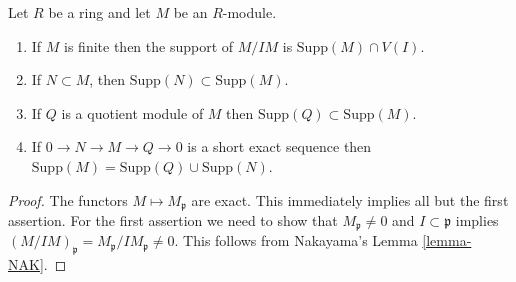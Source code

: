 \begin{lemma}
\label{lemma-support-quotient}
Let $R$ be a ring and let $M$ be an $R$-module.
\begin{enumerate}
\item If $M$ is finite then the support
of $M/IM$ is $\text{Supp}(M) \cap V(I)$.
\item If $N \subset M$, then $\text{Supp}(N) \subset
\text{Supp}(M)$.
\item If $Q$ is a quotient module of $M$ then $\text{Supp}(Q) \subset
\text{Supp}(M)$.
\item If $0 \to N \to M \to Q \to 0$ is a short exact sequence
then $\text{Supp}(M) = \text{Supp}(Q) \cup \text{Supp}(N)$.
\end{enumerate}
\end{lemma}

\begin{proof}
The functors $M \mapsto M_{\mathfrak p}$ are exact. This immediately
implies all but the first assertion. For the first assertion
we need to show that $M_\mathfrak p \not = 0$ and
$I \subset \mathfrak p$ implies $(M/IM)_{\mathfrak p}
= M_\mathfrak p/IM_\mathfrak p \not = 0$. This follows
from Nakayama's Lemma \ref{lemma-NAK}.
\end{proof}